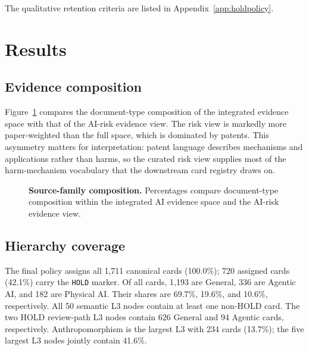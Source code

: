\documentclass[11pt,a4paper]{article}
\newcommand{\code}[1]{\texttt{#1}}
\begin{document}
The qualitative retention criteria are listed in Appendix~\ref{app:holdpolicy}.

\section{Results}
\label{sec:results}

\subsection{Evidence composition}

Figure~\ref{fig:composition} compares the document-type composition of the
integrated evidence space with that of the AI-risk evidence view. The risk view
is markedly more paper-weighted than the full space, which is dominated by
patents. This asymmetry matters for interpretation: patent language describes
mechanisms and applications rather than harms, so the curated risk view
supplies most of the harm-mechanism vocabulary that the downstream card
registry draws on.

\begin{figure}[H]
\centering
{}
\caption{\textbf{Source-family composition.} Percentages compare document-type
composition within the integrated AI evidence space and the AI-risk evidence
view.}
\label{fig:composition}
\end{figure}

\subsection{Hierarchy coverage}

The final policy assigns all 1,711 canonical cards (100.0\%); 720 assigned
cards (42.1\%) carry the \code{HOLD} marker. Of all cards, 1,193 are General,
336 are Agentic AI, and 182 are Physical AI. Their shares are 69.7\%, 19.6\%,
and 10.6\%, respectively. All 50 semantic L3 nodes contain at least one
non-HOLD card. The two HOLD review-path L3 nodes contain 626 General and 94
Agentic cards, respectively.
Anthropomorphism is the largest L3 with 234 cards (13.7\%); the five largest
L3 nodes jointly contain 41.6\%.
\end{document}
